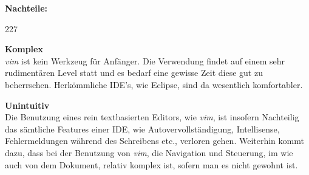 \textbf{Nachteile:}
\begin{dinglist}{227}
	\item{\textbf{Komplex}}\\
	\textit{vim} ist kein Werkzeug f\"ur Anf\"anger. Die Verwendung findet auf einem sehr rudiment\"aren Level statt und es bedarf eine gewisse Zeit diese gut zu beherrschen. Herk\"ommliche IDE's, wie Eclipse, sind da wesentlich komfortabler.
	\item{\textbf{Unintuitiv}}\\
	Die Benutzung eines rein textbasierten Editors, wie \textit{vim}, ist insofern Nachteilig das s\"amtliche Features einer IDE, wie Autovervollst\"andigung, Intellisense, Fehlermeldungen w\"ahrend des Schreibens etc., verloren gehen. Weiterhin kommt dazu, dass bei der Benutzung von \textit{vim}, die Navigation und Steuerung, im wie auch von dem Dokument, relativ komplex ist, sofern man es nicht gewohnt ist.
\end{dinglist}

